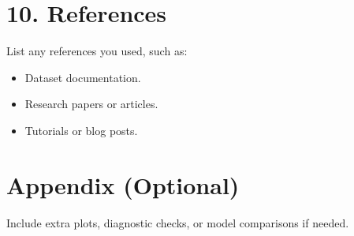\documentclass[
]{article}
\providecommand{\tightlist}{%
  \setlength{\itemsep}{0pt}\setlength{\parskip}{0pt}}
\begin{document}
\section{10. References}\label{references}

List any references you used, such as:

\begin{itemize}
\tightlist
\item
  Dataset documentation.\\
\item
  Research papers or articles.\\
\item
  Tutorials or blog posts.
\end{itemize}

\section{Appendix (Optional)}\label{appendix-optional}

Include extra plots, diagnostic checks, or model comparisons if needed.
\end{document}
